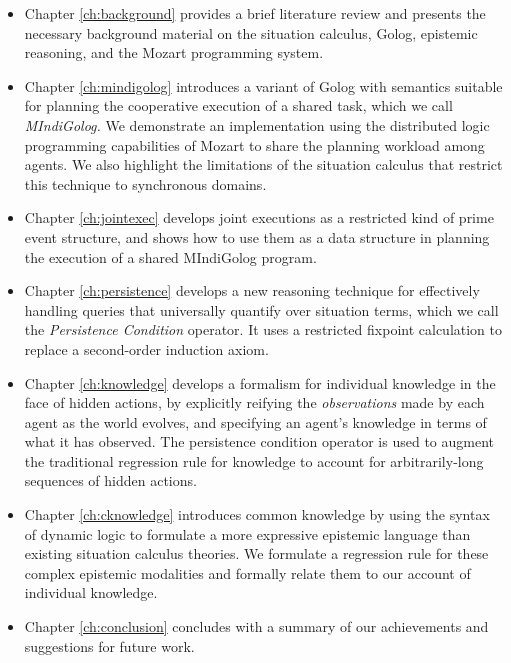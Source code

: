 \begin{itemize}
\item Chapter \ref{ch:background} provides a brief literature review and
presents the necessary background material on the situation calculus,
Golog, epistemic reasoning, and the Mozart programming system. 
\item Chapter \ref{ch:mindigolog} introduces a variant of Golog with semantics
suitable for planning the cooperative execution of a shared task,
which we call \emph{MIndiGolog.} We demonstrate an implementation
using the distributed logic programming capabilities of Mozart to
share the planning workload among agents. We also highlight the limitations
of the situation calculus that restrict this technique to synchronous
domains. 
\item Chapter \ref{ch:jointexec} develops joint executions as a restricted
kind of prime event structure, and shows how to use them as a data
structure in planning the execution of a shared MIndiGolog program. 
\item Chapter \ref{ch:persistence} develops a new reasoning technique for
effectively handling queries that universally quantify over situation
terms, which we call the \emph{Persistence Condition} operator. It
uses a restricted fixpoint calculation to replace a second-order induction
axiom. 
\item Chapter \ref{ch:knowledge} develops a formalism for individual knowledge
in the face of hidden actions, by explicitly reifying the \emph{observations}
made by each agent as the world evolves, and specifying an agent's
knowledge in terms of what it has observed. The persistence condition
operator is used to augment the traditional regression rule for knowledge
to account for arbitrarily-long sequences of hidden actions. 
\item Chapter \ref{ch:cknowledge} introduces common knowledge by using
the syntax of dynamic logic to formulate a more expressive epistemic
language than existing situation calculus theories. We formulate a
regression rule for these complex epistemic modalities and formally
relate them to our account of individual knowledge.
\item Chapter \ref{ch:conclusion} concludes with a summary of our achievements
and suggestions for future work. 
\end{itemize}
